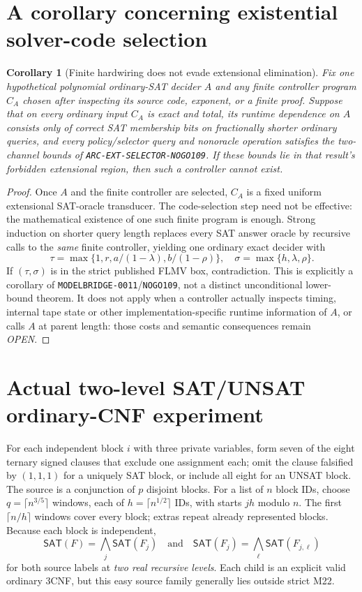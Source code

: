 \documentclass[11pt]{article}
\newtheorem{corollary}[theorem]{Corollary}
\newcommand{\SAT}{\mathsf{SAT}}
\begin{document}
\section{A corollary concerning existential solver-code selection}
\begin{corollary}[Finite hardwiring does not evade extensional elimination]
Fix \emph{one} hypothetical polynomial ordinary-SAT decider $A$ and any finite controller program $C_A$ chosen after inspecting its source code, exponent, or a finite proof. Suppose that on every ordinary input $C_A$ is exact and total, its \emph{runtime} dependence on $A$ consists only of correct SAT membership bits on fractionally shorter ordinary queries, and every policy/selector query and nonoracle operation satisfies the two-channel bounds of \texttt{ARC-EXT-SELECTOR-NOGO109}. If these bounds lie in that result's forbidden extensional region, then such a controller cannot exist.
\end{corollary}
\begin{proof}
Once $A$ and the finite controller are selected, $C_A$ is a fixed uniform extensional SAT-oracle transducer. The code-selection step need not be effective: the mathematical existence of one such finite program is enough. Strong induction on shorter query length replaces every SAT answer oracle by recursive calls to the \emph{same} finite controller, yielding one ordinary exact decider with
\[
\tau=\max\{1,r,a/(1-\lambda),b/(1-\rho)\},\quad
\sigma=\max\{h,\lambda,\rho\}.
\]
If $(\tau,\sigma)$ is in the strict published FLMV box, contradiction. This is explicitly a corollary of \texttt{MODELBRIDGE-0011}/\texttt{NOGO109}, not a distinct unconditional lower-bound theorem. It does not apply when a controller actually inspects timing, internal tape state or other implementation-specific runtime information of $A$, or calls $A$ at parent length: those costs and semantic consequences remain \emph{OPEN}. \end{proof}

\section{Actual two-level SAT/UNSAT ordinary-CNF experiment}
For each independent block $i$ with three private variables, form seven of the eight ternary signed clauses that exclude one assignment each; omit the clause falsified by $(1,1,1)$ for a uniquely SAT block, or include all eight for an UNSAT block. The source is a conjunction of $p$ disjoint blocks. For a list of $n$ block IDs, choose $q=\lceil n^{3/5}\rceil$ windows, each of $h=\lceil n^{1/2}\rceil$ IDs, with starts $jh$ modulo $n$. The first $\lceil n/h\rceil$ windows cover every block; extras repeat already represented blocks. Because each block is independent,
\[
\SAT(F)=\bigwedge_j \SAT(F_j)
\quad\text{and}\quad
\SAT(F_j)=\bigwedge_\ell \SAT(F_{j,\ell})
\]
for both source labels at \emph{two real recursive levels}. Each child is an explicit valid ordinary 3CNF, but this easy source family generally lies outside strict M22.
\end{document}
